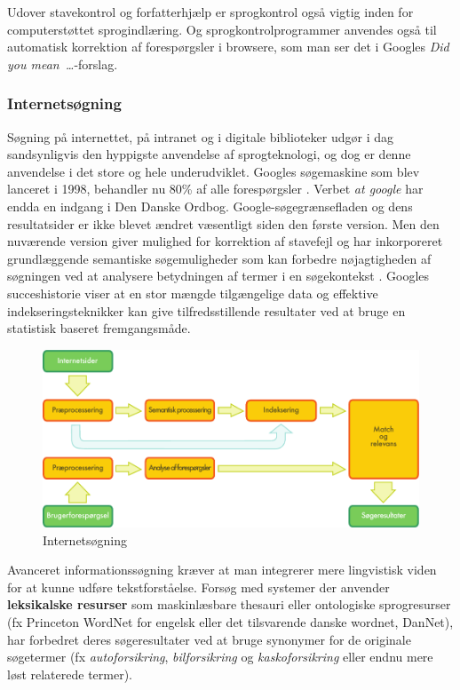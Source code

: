 \begin{multicols}{2}
Udover stavekontrol og forfatterhj\ae lp er sprogkontrol \mbox{ogs\aa} vigtig inden for computerst\o ttet sprogindl\ae ring. Og sprogkontrolprogrammer anvendes \mbox{ogs\aa} til automatisk korrektion af foresp\o rgsler i browsere, som man ser det i Googles {\it Did you mean~\dots}-forslag.

\subsubsection{Internets\o gning}

S\o gning \mbox{p\aa} internettet, \mbox{p\aa} intranet og i digitale bi\-blioteker udg\o r i dag sandsynligvis den hyppigste anvendelse af sprogteknologi, og dog er denne anvendelse i det store og hele underudviklet. Googles s\o gemaskine som blev lanceret i 1998, behandler nu 80\% af alle foresp\o rgsler \cite{spi1}.   Verbet {\it at google} har endda en indgang i Den Danske Ordbog. Google-s\o gegr\ae nsefladen og dens resultatsider er ikke blevet \ae ndret v\ae sentligt siden den f\o rste version. Men den nuv\ae rende version giver mulighed for korrektion af stavefejl og har inkorporeret grundl\ae ggende semantiske s\o gemuligheder som kan forbedre n\o jagtigheden af s\o gningen ved at analysere betydningen af termer i en s\o gekontekst \cite{pc1}.   Googles succeshistorie viser at en stor m\ae ngde tilg\ae ngelige data og effektive indekseringsteknikker kan give tilfredsstillende resultater ved at bruge en statistisk baseret fremgangsm\aa de.

\begin{figure}[t]
  \center
  \includegraphics[width=\textwidth]{../_media/danish/web_search_architecture}
  \caption{Internetsøgning}
  \label{fig:websearcharch_de}
\end{figure}

Avanceret informationss\o gning kr\ae ver at man inte\-grerer mere lingvistisk viden for at kunne udf\o re tekst\-forst\aa else. Fors\o g med systemer der anvender {\bf leksikalske resurser} som maskinl\ae sbare thesauri eller ontologiske sprogresurser (fx Princeton WordNet for engelsk eller det tilsvarende danske wordnet, DanNet), har forbedret deres s\o geresultater ved at bruge sy\-nonymer for de originale s\o getermer (fx {\it autoforsikring}, {\it bilforsikring} og {\it kaskoforsikring} eller endnu mere l\o st relaterede termer). 


\end{multicols}

